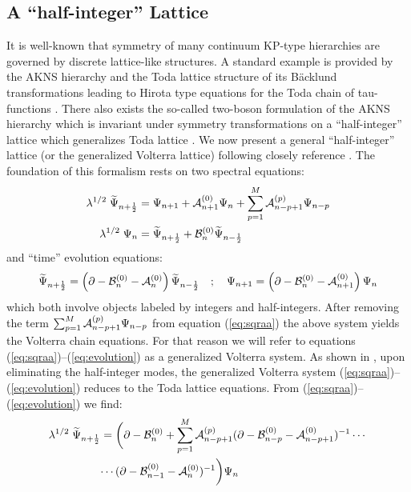 \documentclass[12pt]{article}
\numberwithin{equation}{section}
\def\rf#1{(\ref{eq:#1})}
\def\lab#1{\label{eq:#1}}
\begin{document}
\subsection{A ``half-integer'' Lattice}
It is well-known that symmetry of many continuum KP-type hierarchies 
are governed by discrete lattice-like structures. A standard example is provided
by the AKNS hierarchy and the Toda lattice structure of its B\"acklund
transformations leading to Hirota type equations for the Toda chain of
tau-functions \cite{Aratyn:1993zi}.
There also exists the  so-called two-boson formulation of the AKNS
hierarchy which is invariant under symmetry transformations on 
a  ``half-integer'' lattice which generalizes Toda lattice \cite{Aratyn:1993zi}.
We now present a general ``half-integer'' lattice (or 
the generalized Volterra lattice) following closely reference \cite{Aratyn:1994vc}.
The foundation of this formalism rests on two spectral equations:
\begin{align}
\lambda^{1/2}\; {\widetilde \Psi}_{n+\frac12} 
&=  \Psi_{n+1} + {\cal A}^{(0)}_{n+1} \Psi_n +
\sum_{p=1}^M {\cal A}^{(p)}_{n-p+1} \Psi_{n -p} \lab{sqraa} \\
\lambda^{1/2} \; \Psi_n &= {\widetilde \Psi}_{n+\frac12} + 
{\cal B}^{(0)}_n {\widetilde \Psi}_{n-\frac12}
\lab{sqrbb}
\end{align}
and ``time'' evolution equations:
\begin{equation}
{\widetilde \Psi}_{n+\frac12} = \left( \partial - {\cal B}^{(0)}_n - {\cal A}^{(0)}_{n} \right){\widetilde \Psi}_{n-\frac12}
\quad;\quad
\Psi_{n+1} = \left( \partial - {\cal B}^{(0)}_n - {\cal A}^{(0)}_{n+1} \right) \Psi_{n}
\lab{evolution}
\end{equation}
which both involve objects labeled by integers and half-integers.
After removing the term $ \sum_{p=1}^M {\cal A}^{(p)}_{n-p+1} \Psi_{n
-p}$ from equation \rf{sqraa} the above system yields the Volterra
chain equations. For that reason we will refer to equations \rf{sqraa}--\rf{evolution}
as a generalized Volterra system.
As shown in \cite{Aratyn:1994vc}, upon
eliminating the half-integer modes, the generalized Volterra system
\rf{sqraa}--\rf{evolution} reduces to the Toda lattice
equations. 
{}From \rf{sqraa}--\rf{evolution} we find:
\begin{equation}
\begin{split}
\lambda^{1/2}\; {\widetilde \Psi}_{n+\frac12}&= \biggl( \partial - {\cal B}^{(0)}_n +
   \sum_{p=1}^M
{\cal A}^{(p)}_{n-p+1} ( \partial - {\cal B}^{(0)}_{n-p} - {\cal A}^{(0)}_{n-p+1} )^{-1}
\cdots \biggr. \\
&\biggl. \cdots ( \partial - {\cal B}^{(0)}_{n-1} - {\cal A}^{(0)}_{n} )^{-1}
\biggr) \Psi_n
\lab{speca}
\end{split}
\end{equation}
\end{document}
